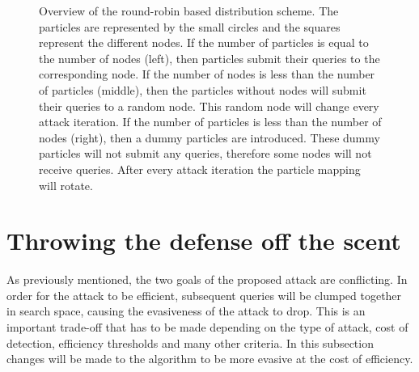 \begin{figure}
\caption[Overview of the round-robin based distribution scheme]{Overview of the round-robin based distribution scheme. The particles are represented by the small circles and the squares represent the different nodes. If the number of particles is equal to the number of nodes (left), then particles submit their queries to the corresponding node. If the number of nodes is less than the number of particles (middle), then the particles without nodes will submit their queries to a random node. This random node will change every attack iteration. If the number of particles is less than the number of nodes (right), then a dummy particles are introduced. These dummy particles will not submit any queries, therefore some nodes will not receive queries. After every attack iteration the particle mapping will rotate.}
\label{fig:round_robin}
\end{figure}

\section{Throwing the defense off the scent}
As previously mentioned, the two goals of the proposed attack are conflicting. In order for the attack to be efficient, subsequent queries will be clumped together in search space, causing the evasiveness of the attack to drop. This is an important trade-off that has to be made depending on the type of attack, cost of detection, efficiency thresholds and many other criteria. In this subsection changes will be made to the algorithm to be more evasive at the cost of efficiency.\\

